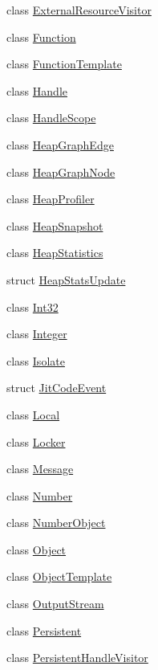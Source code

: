 \begin{DoxyCompactItemize}
\item 
class \hyperlink{classv8_1_1_external_resource_visitor}{External\+Resource\+Visitor}
\item 
class \hyperlink{classv8_1_1_function}{Function}
\item 
class \hyperlink{classv8_1_1_function_template}{Function\+Template}
\item 
class \hyperlink{classv8_1_1_handle}{Handle}
\item 
class \hyperlink{classv8_1_1_handle_scope}{Handle\+Scope}
\item 
class \hyperlink{classv8_1_1_heap_graph_edge}{Heap\+Graph\+Edge}
\item 
class \hyperlink{classv8_1_1_heap_graph_node}{Heap\+Graph\+Node}
\item 
class \hyperlink{classv8_1_1_heap_profiler}{Heap\+Profiler}
\item 
class \hyperlink{classv8_1_1_heap_snapshot}{Heap\+Snapshot}
\item 
class \hyperlink{classv8_1_1_heap_statistics}{Heap\+Statistics}
\item 
struct \hyperlink{structv8_1_1_heap_stats_update}{Heap\+Stats\+Update}
\item 
class \hyperlink{classv8_1_1_int32}{Int32}
\item 
class \hyperlink{classv8_1_1_integer}{Integer}
\item 
class \hyperlink{classv8_1_1_isolate}{Isolate}
\item 
struct \hyperlink{structv8_1_1_jit_code_event}{Jit\+Code\+Event}
\item 
class \hyperlink{classv8_1_1_local}{Local}
\item 
class \hyperlink{classv8_1_1_locker}{Locker}
\item 
class \hyperlink{classv8_1_1_message}{Message}
\item 
class \hyperlink{classv8_1_1_number}{Number}
\item 
class \hyperlink{classv8_1_1_number_object}{Number\+Object}
\item 
class \hyperlink{classv8_1_1_object}{Object}
\item 
class \hyperlink{classv8_1_1_object_template}{Object\+Template}
\item 
class \hyperlink{classv8_1_1_output_stream}{Output\+Stream}
\item 
class \hyperlink{classv8_1_1_persistent}{Persistent}
\item 
class \hyperlink{classv8_1_1_persistent_handle_visitor}{Persistent\+Handle\+Visitor}

\end{DoxyCompactItemize}
